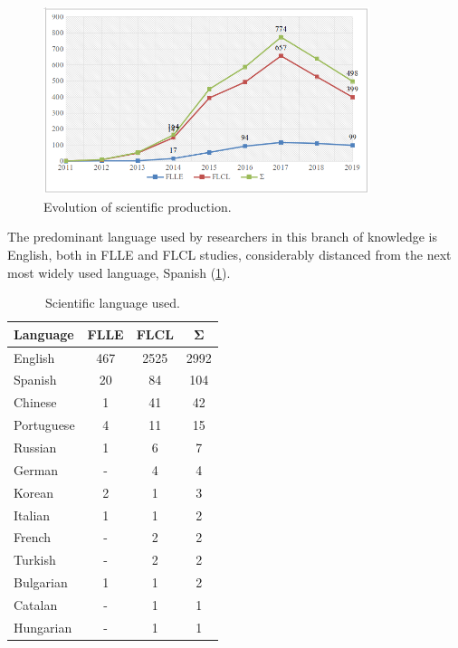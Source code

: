 \documentclass{textolivre-html}
\begin{document}
\begin{figure}[htbp]
 \centering
 \includegraphics[width=0.85\textwidth]{Fig01.png}
 \caption{Evolution of scientific production.}
 \label{Fig01}
\end{figure}

The predominant language used by researchers in this branch of knowledge is English, both in FLLE and FLCL studies, considerably distanced from the next most widely used language, Spanish (\cref{tbl-tabela-04}).


\begin{table}[htpb]
\caption{Scientific language used.}
\label{tbl-tabela-04}
\centering
\begin{tabular}{lccc}
\toprule
\textbf{Language} & \textbf{FLLE} & \textbf{FLCL} & \textbf{Σ} \\ 
\midrule
English    & 467 & 2525 & 2992 \\ 
Spanish    & 20  & 84   & 104  \\ 
Chinese    & 1   & 41   & 42   \\ 
Portuguese & 4   & 11   & 15   \\ 
Russian    & 1   & 6    & 7    \\ 
German     & -   & 4    & 4    \\ 
Korean     & 2   & 1    & 3    \\ 
Italian    & 1   & 1    & 2    \\ 
French     & -   & 2    & 2    \\ 
Turkish    & -   & 2    & 2    \\ 
Bulgarian  & 1   & 1    & 2    \\ 
Catalan    & -   & 1    & 1    \\ 
Hungarian  & -   & 1    & 1    \\ 
\bottomrule
\end{tabular}
\end{table}
\end{document}
